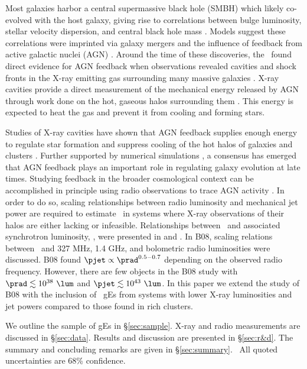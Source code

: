 \documentclass[12pt, preprint]{aastex}
\begin{document}
Most galaxies harbor a central supermassive black hole (SMBH) which
likely co-evolved with the host galaxy, giving rise to correlations
between bulge luminosity, stellar velocity dispersion, and central
black hole mass \citep{1995ARA&A..33..581K, magorrian}. Models suggest
these correlations were imprinted via galaxy mergers and the influence
of feedback from active galactic nuclei (AGN)
\citep[\eg][]{1998A&A...331L...1S, 2000MNRAS.311..576K}. Around the
time of these discoveries, the \cxo\ found direct evidence for AGN
feedback when observations revealed cavities and shock fronts in the
X-ray emitting gas surrounding many massive galaxies
\citep[\eg][]{2000ApJ...534L.135M, perseus1, 2007ApJ...665.1057F}.
X-ray cavities provide a direct measurement of the mechanical energy
released by AGN through work done on the hot, gaseous halos
surrounding them \citep{2000ApJ...534L.135M}. This energy is expected
to heat the gas \citep{2001ApJ...554..261C} and prevent it from
cooling and forming stars.

Studies of X-ray cavities have shown that AGN feedback supplies enough
energy to regulate star formation and suppress cooling of the hot
halos of galaxies and clusters \citep{birzan04, 2005MNRAS.364.1343D,
  rafferty06}. Further supported by numerical simulations
\citep[\eg][]{croton06, bower06}, a consensus has emerged that AGN
feedback plays an important role in regulating galaxy evolution at
late times. Studying feedback in the broader cosmological context can
be accomplished in principle using radio observations to trace AGN
activity \citep[\eg][]{best07}. In order to do so, scaling
relationships between radio luminosity and mechanical jet power are
required to estimate \pjet\ in systems where X-ray observations of
their halos are either lacking or infeasible. Relationships between
\pjet\ and associated synchrotron luminosity, \prad, were presented in
\citet[][hereafter B04]{birzan04} and \citet[][hereafter
  B08]{birzan08}. In B08, scaling relations between \pjet\ and 327
MHz, 1.4 GHz, and bolometric radio luminosities were discussed. B08
found $\pjet \propto \prad^{0.5-0.7}$ depending on the observed radio
frequency. However, there are few objects in the B08 study with $\prad
\lesssim 10^{38} ~\lum$ and $\pjet \lesssim 10^{43} ~\lum$. In this
paper we extend the study of B08 with the inclusion of \samp\ gEs from
systems with lower X-ray luminosities and jet powers compared to those
found in rich clusters.

We outline the sample of gEs in \S\ref{sec:sample}. X-ray and radio
measurements are discussed in \S\ref{sec:data}. Results and discussion
are presented in \S\ref{sec:r&d}. The summary and concluding remarks
are given in \S\ref{sec:summary}. \LCDM\ All quoted uncertainties are
68\% confidence.
\end{document}
